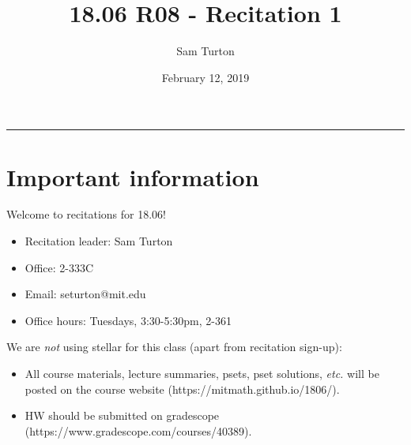 \documentclass[11pt]{article}
\title{18.06 R08 - Recitation 1}
\author{Sam Turton}
\date{February 12, 2019}
\begin{document}
\maketitle


\rule{\textwidth}{1pt}
\section{Important information}
Welcome to recitations for 18.06! 
\begin{itemize}
\item Recitation leader: Sam Turton
\item Office: 2-333C 
\item Email: seturton@mit.edu
\item Office hours: Tuesdays, 3:30-5:30pm, 2-361
\end{itemize}

\noindent We are \emph{not} using stellar for this class (apart from recitation sign-up):
\begin{itemize}
\item All course materials, lecture summaries, psets, pset solutions, \emph{etc.} will be posted on the course website (https://mitmath.github.io/1806/).
\item HW should be submitted on gradescope (https://www.gradescope.com/courses/40389).
\end{itemize}
 
\end{document}

